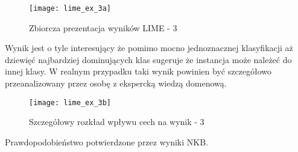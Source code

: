 \begin{figure}[H]
    \centering
    \texttt{[image: lime\_ex\_3a]}
    \caption{Zbiorcza prezentacja wyników LIME - 3}
    \label{fig:lime_ex_3a}
\end{figure}

Wynik jest o tyle interesujący że pomimo mocno jednoznacznej klasyfikacji aż dziewięć najbardziej dominujących klas sugeruje że instancja może należeć do innej klasy. W realnym przypadku taki wynik powinien być szczegółowo przeanalizowany przez osobę z ekspercką wiedzą domenową.\\

\begin{figure}[H]
    \centering
    \texttt{[image: lime\_ex\_3b]}
    \caption{Szczegółowy rozkład wpływu cech na wynik - 3}
    \label{fig:lime_ex_3b}
\end{figure}

Prawdopodobieństwo potwierdzone przez wyniki NKB.\\